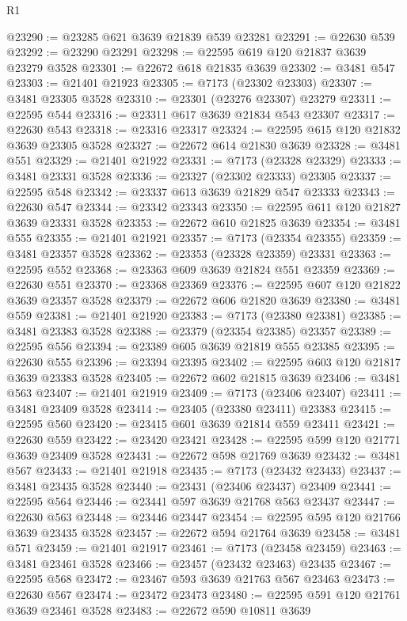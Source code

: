 \begin{lexlean}{R1}
\begin{coremodule}
@23290 := @23285 @621 @3639 @21839 @539 @23281
@23291 := @22630 @539
@23292 := @23290 @23291
@23298 := @22595 @619 @120 @21837 @3639 @23279 @3528
@23301 := @22672 @618 @21835 @3639
@23302 := @3481 @547
@23303 := @21401 @21923
@23305 := @7173 (@23302 @23303)
@23307 := @3481 @23305 @3528
@23310 := @23301 (@23276 @23307) @23279
@23311 := @22595 @544
@23316 := @23311 @617 @3639 @21834 @543 @23307
@23317 := @22630 @543
@23318 := @23316 @23317
@23324 := @22595 @615 @120 @21832 @3639 @23305 @3528
@23327 := @22672 @614 @21830 @3639
@23328 := @3481 @551
@23329 := @21401 @21922
@23331 := @7173 (@23328 @23329)
@23333 := @3481 @23331 @3528
@23336 := @23327 (@23302 @23333) @23305
@23337 := @22595 @548
@23342 := @23337 @613 @3639 @21829 @547 @23333
@23343 := @22630 @547
@23344 := @23342 @23343
@23350 := @22595 @611 @120 @21827 @3639 @23331 @3528
@23353 := @22672 @610 @21825 @3639
@23354 := @3481 @555
@23355 := @21401 @21921
@23357 := @7173 (@23354 @23355)
@23359 := @3481 @23357 @3528
@23362 := @23353 (@23328 @23359) @23331
@23363 := @22595 @552
@23368 := @23363 @609 @3639 @21824 @551 @23359
@23369 := @22630 @551
@23370 := @23368 @23369
@23376 := @22595 @607 @120 @21822 @3639 @23357 @3528
@23379 := @22672 @606 @21820 @3639
@23380 := @3481 @559
@23381 := @21401 @21920
@23383 := @7173 (@23380 @23381)
@23385 := @3481 @23383 @3528
@23388 := @23379 (@23354 @23385) @23357
@23389 := @22595 @556
@23394 := @23389 @605 @3639 @21819 @555 @23385
@23395 := @22630 @555
@23396 := @23394 @23395
@23402 := @22595 @603 @120 @21817 @3639 @23383 @3528
@23405 := @22672 @602 @21815 @3639
@23406 := @3481 @563
@23407 := @21401 @21919
@23409 := @7173 (@23406 @23407)
@23411 := @3481 @23409 @3528
@23414 := @23405 (@23380 @23411) @23383
@23415 := @22595 @560
@23420 := @23415 @601 @3639 @21814 @559 @23411
@23421 := @22630 @559
@23422 := @23420 @23421
@23428 := @22595 @599 @120 @21771 @3639 @23409 @3528
@23431 := @22672 @598 @21769 @3639
@23432 := @3481 @567
@23433 := @21401 @21918
@23435 := @7173 (@23432 @23433)
@23437 := @3481 @23435 @3528
@23440 := @23431 (@23406 @23437) @23409
@23441 := @22595 @564
@23446 := @23441 @597 @3639 @21768 @563 @23437
@23447 := @22630 @563
@23448 := @23446 @23447
@23454 := @22595 @595 @120 @21766 @3639 @23435 @3528
@23457 := @22672 @594 @21764 @3639
@23458 := @3481 @571
@23459 := @21401 @21917
@23461 := @7173 (@23458 @23459)
@23463 := @3481 @23461 @3528
@23466 := @23457 (@23432 @23463) @23435
@23467 := @22595 @568
@23472 := @23467 @593 @3639 @21763 @567 @23463
@23473 := @22630 @567
@23474 := @23472 @23473
@23480 := @22595 @591 @120 @21761 @3639 @23461 @3528
@23483 := @22672 @590 @10811 @3639

\end{coremodule}
\end{lexlean}
